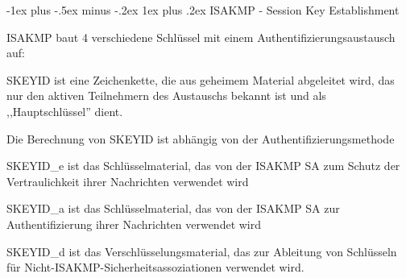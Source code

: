 \documentclass[a4paper]{article}
\makeatletter
\renewcommand{\subsubsection}{\@startsection{subsubsection}{3}{0mm}%
 {-1ex plus -.5ex minus -.2ex}%
 {1ex plus .2ex}%
 {\normalfont\small\bfseries}}
\makeatother
\begin{document}
\begin{multicols}{3}
\begin{itemize*}
            \subsubsection{ISAKMP - Session Key
                  Establishment}
            \begin{itemize*}
                  \item ISAKMP baut 4 verschiedene Schlüssel mit einem
                  Authentifizierungsaustausch auf:
                  \begin{itemize*}
                        \item SKEYID ist eine Zeichenkette, die aus geheimem Material abgeleitet wird, das nur den aktiven Teilnehmern des Austauschs bekannt ist und als ,,Hauptschlüssel'' dient.
                        \begin{itemize*}
                              \item Die Berechnung von SKEYID ist abhängig von der Authentifizierungsmethode
                        \end{itemize*}
                        \item SKEYID\_e ist das Schlüsselmaterial, das von der ISAKMP SA zum Schutz der Vertraulichkeit ihrer Nachrichten verwendet wird
                        \item SKEYID\_a ist das Schlüsselmaterial, das von der ISAKMP SA zur Authentifizierung ihrer Nachrichten verwendet wird
                        \item SKEYID\_d ist das Verschlüsselungsmaterial, das zur Ableitung von Schlüsseln für Nicht-ISAKMP-Sicherheitsassoziationen verwendet wird.
                  \end{itemize*}
            \end{itemize*}


\end{itemize*}
\end{multicols}
\end{document}
